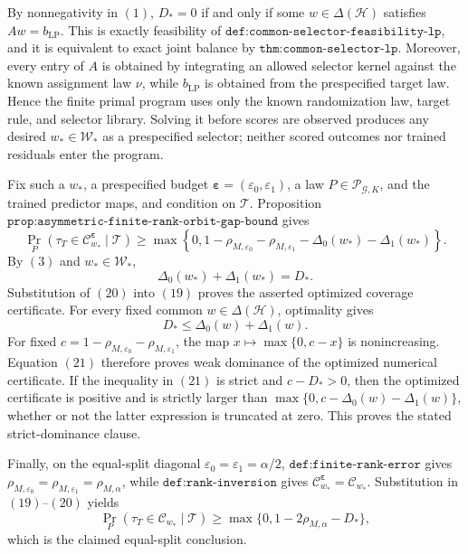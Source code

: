 By nonnegativity in \((1)\), \(D_*=0\) if and only if some \(w\in\Delta(\mathcal H)\) satisfies \(Aw=b_{\mathrm{LP}}\). This is exactly feasibility of \(\texttt{def:common-selector-feasibility-lp}\), and it is equivalent to exact joint balance by \(\texttt{thm:common-selector-lp}\). Moreover, every entry of \(A\) is obtained by integrating an allowed selector kernel against the known assignment law \(\nu\), while \(b_{\mathrm{LP}}\) is obtained from the prespecified target law. Hence the finite primal program uses only the known randomization law, target rule, and selector library. Solving it before scores are observed produces any desired \(w_*\in\mathcal W_*\) as a prespecified selector; neither scored outcomes nor trained residuals enter the program.

Fix such a \(w_*\), a prespecified budget \(\boldsymbol\varepsilon=(\varepsilon_0,\varepsilon_1)\), a law \(P\in\mathcal P_{\mathcal G,K}\), and the trained predictor maps, and condition on \(\mathcal T\). Proposition \(\texttt{prop:asymmetric-finite-rank-orbit-gap-bound}\) gives
\[
\Pr_P\!\left(\tau_T\in\mathcal C^{\boldsymbol\varepsilon}_{w_*}\mid\mathcal T\right)\ge\max\!\left\{0,1-\rho_{M,\varepsilon_0}-\rho_{M,\varepsilon_1}-\Delta_0(w_*)-\Delta_1(w_*)\right\}.
\tag{19}
\]
By \((3)\) and \(w_*\in\mathcal W_*\),
\[
\Delta_0(w_*)+\Delta_1(w_*)=D_*.
\tag{20}
\]
Substitution of \((20)\) into \((19)\) proves the asserted optimized coverage certificate. For every fixed common \(w\in\Delta(\mathcal H)\), optimality gives
\[
D_*\le\Delta_0(w)+\Delta_1(w).
\tag{21}
\]
For fixed \(c=1-\rho_{M,\varepsilon_0}-\rho_{M,\varepsilon_1}\), the map \(x\mapsto\max\{0,c-x\}\) is nonincreasing. Equation \((21)\) therefore proves weak dominance of the optimized numerical certificate. If the inequality in \((21)\) is strict and \(c-D_*>0\), then the optimized certificate is positive and is strictly larger than \(\max\{0,c-\Delta_0(w)-\Delta_1(w)\}\), whether or not the latter expression is truncated at zero. This proves the stated strict-dominance clause.

Finally, on the equal-split diagonal \(\varepsilon_0=\varepsilon_1=\alpha/2\), \(\texttt{def:finite-rank-error}\) gives \(\rho_{M,\varepsilon_0}=\rho_{M,\varepsilon_1}=\rho_{M,\alpha}\), while \(\texttt{def:rank-inversion}\) gives \(\mathcal C^{\boldsymbol\varepsilon}_{w_*}=\mathcal C_{w_*}\). Substitution in \((19)\)--\((20)\) yields
\[
\Pr_P(\tau_T\in\mathcal C_{w_*}\mid\mathcal T)\ge\max\{0,1-2\rho_{M,\alpha}-D_*\},
\]
which is the claimed equal-split conclusion.